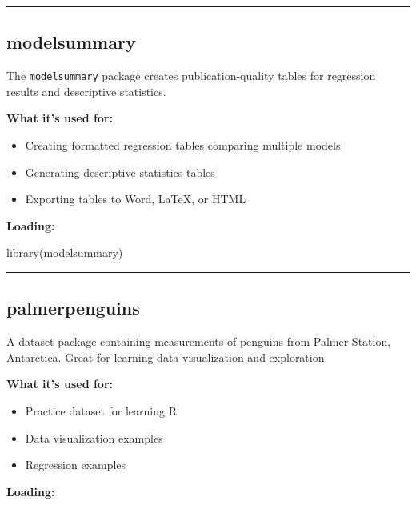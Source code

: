 \documentclass[
  letterpaper,
  DIV=11,
  numbers=noendperiod]{scrreprt}
\newenvironment{Shaded}{\begin{snugshade}}{\end{snugshade}}
\newcommand{\FunctionTok}[1]{\textcolor[rgb]{0.28,0.35,0.67}{#1}}
\newcommand{\NormalTok}[1]{\textcolor[rgb]{0.00,0.23,0.31}{#1}}
\providecommand{\tightlist}{%
  \setlength{\itemsep}{0pt}\setlength{\parskip}{0pt}}
\begin{document}
\begin{center}\rule{0.5\linewidth}{0.5pt}\end{center}

\subsection{modelsummary}\label{modelsummary}

The \texttt{modelsummary} package creates publication-quality tables for
regression results and descriptive statistics.

\textbf{What it's used for:}

\begin{itemize}
\tightlist
\item
  Creating formatted regression tables comparing multiple models
\item
  Generating descriptive statistics tables
\item
  Exporting tables to Word, LaTeX, or HTML
\end{itemize}

\textbf{Loading:}

\begin{Shaded}
\begin{Highlighting}[]
\FunctionTok{library}\NormalTok{(modelsummary)}
\end{Highlighting}
\end{Shaded}

\begin{center}\rule{0.5\linewidth}{0.5pt}\end{center}

\subsection{palmerpenguins}\label{palmerpenguins}

A dataset package containing measurements of penguins from Palmer
Station, Antarctica. Great for learning data visualization and
exploration.

\textbf{What it's used for:}

\begin{itemize}
\tightlist
\item
  Practice dataset for learning R
\item
  Data visualization examples
\item
  Regression examples
\end{itemize}

\textbf{Loading:}
\end{document}
